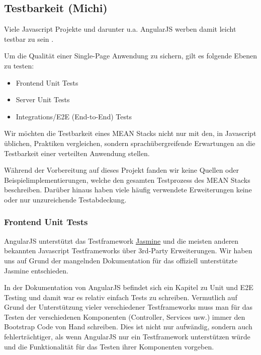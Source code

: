 \subsection{Testbarkeit (Michi)}\label{testbarkeit-michi}

Viele Javascript Projekte und darunter u.a. AngularJS werben damit
leicht testbar zu sein \cite{angular-testing}.

Um die Qualität einer Single-Page Anwendung zu sichern, gilt es folgende
Ebenen zu testen:

\begin{itemize}
\item
  Frontend Unit Tests
\item
  Server Unit Tests
\item
  Integrations/E2E (End-to-End) Tests
\end{itemize}

Wir möchten die Testbarkeit eines MEAN Stacks nicht nur mit den, in
Javascript üblichen, Praktiken vergleichen, sondern sprachübergreifende
Erwartungen an die Testbarkeit einer verteilten Anwendung stellen.

Während der Vorbereitung auf dieses Projekt fanden wir keine Quellen
oder Beispielimplementierungen, welche den gesamten Testprozess des MEAN
Stacks beschreiben. Darüber hinaus haben viele häufig verwendete
Erweiterungen keine oder nur unzureichende Testabdeckung.

\subsubsection{Frontend Unit Tests}\label{frontend-unit-tests}

AngularJS unterstützt das Testframework
\href{http://jasmine.github.io/}{Jasmine} und die meisten anderen
bekannten Javascript Testframeworks über 3rd-Party Erweiterungen. Wir
haben uns auf Grund der mangelnden Dokumentation für das offiziell
unterstützte Jasmine entschieden.

In der Dokumentation von AngularJS befindet sich ein Kapitel zu Unit und
E2E Testing und damit war es relativ einfach Tests zu schreiben.
Vermutlich auf Grund der Unterstützung vieler verschiedener
Testframeworks muss man für das Testen der verschiedenen Komponenten
(Controller, Services usw.) immer den Bootstrap Code von Hand schreiben.
Dies ist nicht nur aufwändig, sondern auch fehlerträchtiger, als wenn
AngularJS nur ein Testframework unterstützen würde und die
Funktionalität für das Testen ihrer Komponenten vorgeben.

